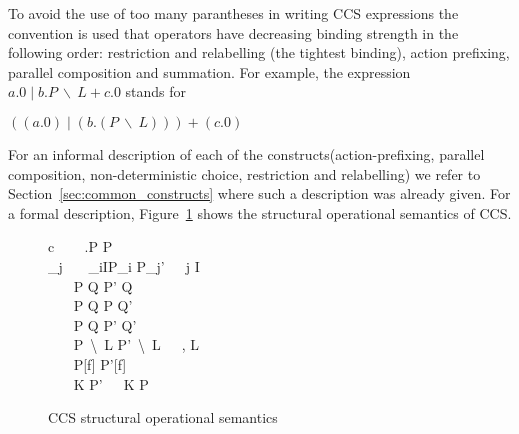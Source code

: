 	To avoid the use of too many parantheses in writing CCS expressions 
	the convention is used that operators have decreasing binding strength in 
	the following order: restriction and relabelling (the tightest binding), 
	action prefixing, parallel composition and summation. For example, the 
	expression $a.0 \mid b.P\ \backslash\ L + c.0$ stands for
		
	\begin{center}$((a.0) \mid (b.(P\ \backslash\ L))) + (c.0)$\end{center}
		
	For an informal description of each of the constructs(action-prefixing, 
	parallel composition, non-deterministic choice, restriction and relabelling) 
	we refer to Section~\ref{sec:common_constructs} where such a description was 
	already given. For a formal description, Figure~\ref{fig:ccs_sos} shows the 
	structural operational semantics of CCS.


\begin{figure}[t!]
\label{fig:ccs_sos}
\caption{CCS structural operational semantics}
\begin{ARRAY}{c}
	\ \ \ \Inference{                              }
	                            {\alpha.P \infarrow{\alpha} P} \vspace{10pt}\\
	_j\ \ \ 
	                              {\sum_{i\in I}P_i \infarrow{\alpha} P_j'}\ \ \ j \in I\vspace{10pt}\\
	\ \ \ 
	                             {P \mid Q \infarrow{\alpha} P' \mid Q} \vspace{10pt}\\
	\ \ \ 
	                             {P \mid Q \infarrow{\alpha} P \mid Q'} \vspace{10pt}\\
	\ \ \ 
	                             {P \mid Q \infarrow{\tau} P' \mid Q'} \vspace{10pt}\\
	\ \ \ 
	                              {P\ \backslash\ L \infarrow{\alpha} P'\  \backslash\ L}\ \ \ \alpha, \overline{\alpha} \notin L\vspace{10pt}\\
	\ \ \ 
	                             {P[f]  P'[f]} \vspace{10pt}\\
	\ \ \ 
	                             {K \infarrow{\alpha} P'}\ \ \ K  P

\end{ARRAY}
\end{figure}

